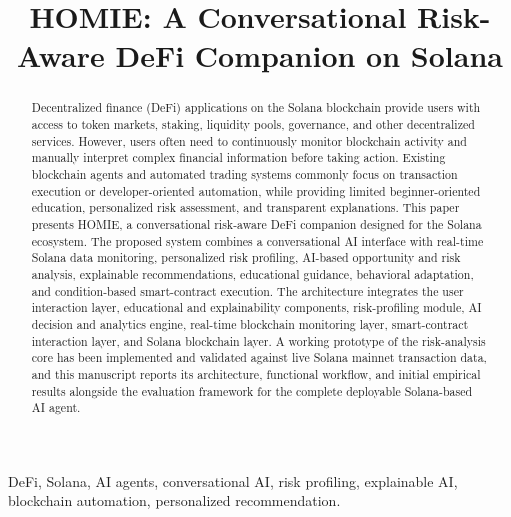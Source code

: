 \documentclass[conference]{IEEEtran}
\begin{document}
\title{HOMIE: A Conversational Risk-Aware DeFi Companion on Solana}

\author{
}

\maketitle

\begin{abstract}
Decentralized finance (DeFi) applications on the Solana blockchain provide users with access to token markets, staking, liquidity pools, governance, and other decentralized services. However, users often need to continuously monitor blockchain activity and manually interpret complex financial information before taking action. Existing blockchain agents and automated trading systems commonly focus on transaction execution or developer-oriented automation, while providing limited beginner-oriented education, personalized risk assessment, and transparent explanations. This paper presents HOMIE, a conversational risk-aware DeFi companion designed for the Solana ecosystem. The proposed system combines a conversational AI interface with real-time Solana data monitoring, personalized risk profiling, AI-based opportunity and risk analysis, explainable recommendations, educational guidance, behavioral adaptation, and condition-based smart-contract execution. The architecture integrates the user interaction layer, educational and explainability components, risk-profiling module, AI decision and analytics engine, real-time blockchain monitoring layer, smart-contract interaction layer, and Solana blockchain layer. A working prototype of the risk-analysis core has been implemented and validated against live Solana mainnet transaction data, and this manuscript reports its architecture, functional workflow, and initial empirical results alongside the evaluation framework for the complete deployable Solana-based AI agent.
\end{abstract}

\begin{IEEEkeywords}
DeFi, Solana, AI agents, conversational AI, risk profiling, explainable AI, blockchain automation, personalized recommendation.
\end{IEEEkeywords}
\end{document}
